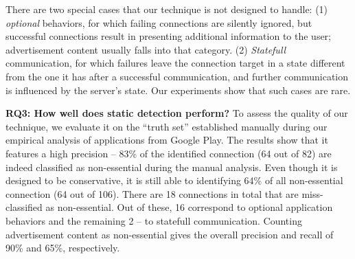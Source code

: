 There are two special cases that our technique is not designed to handle: (1) \emph{optional} behaviors, for which failing connections are silently ignored, but successful connections result in presenting additional information to the user; 
advertisement content usually falls into that category. (2) \emph{Statefull} communication, for which failures leave the 
connection target in a state different from the one it has after a successful communication, and further communication is influenced by the server's state. Our experiments show that such cases are rare. 

%
 



\vspace{0.1in}
\noindent 
{\bf RQ3: How well does static detection perform?}
To assess the quality of our technique, we evaluate it on the ``truth set'' established manually during our empirical analysis of applications from Google Play.
The results show that it features a high precision -- 83\% of the identified connection (64 out of 82) are indeed classified as non-essential during the manual analysis. Even though it is designed to be conservative, it is still able to identifying  64\% of all non-essential connection (64 out of 106).
There are 18 connections in total that are miss-classified as non-essential. Out of these, 16 correspond to optional application behaviors and the remaining 2 -- to statefull communication. Counting advertisement content as non-essential
gives the overall precision and recall of 90\% and 65\%, respectively.  

